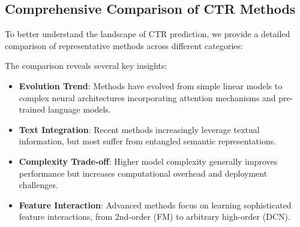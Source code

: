 \subsection{Comprehensive Comparison of CTR Methods}

To better understand the landscape of CTR prediction, we provide a detailed comparison of representative methods across different categories:

\begin{table}[htbp]
\centering
\caption{Comprehensive Comparison of CTR Prediction Methods}
\label{tab:ctr-comparison}
\end{table}

The comparison reveals several key insights:
\begin{itemize}
    \item \textbf{Evolution Trend}: Methods have evolved from simple linear models to complex neural architectures incorporating attention mechanisms and pre-trained language models.
    \item \textbf{Text Integration}: Recent methods increasingly leverage textual information, but most suffer from entangled semantic representations.
    \item \textbf{Complexity Trade-off}: Higher model complexity generally improves performance but increases computational overhead and deployment challenges.
    \item \textbf{Feature Interaction}: Advanced methods focus on learning sophisticated feature interactions, from 2nd-order (FM) to arbitrary high-order (DCN).
\end{itemize}

